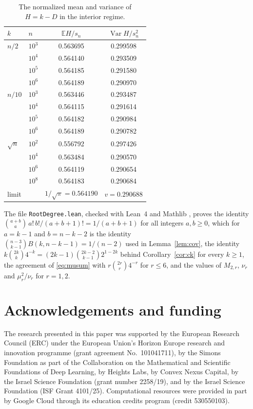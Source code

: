 \documentclass[11pt]{amsart}
\theoremstyle{remark}
\numberwithin{equation}{section}
\newcommand{\E}{\mathbb E}
\newcommand{\1}{\mathbf 1}
\newcommand{\Var}{\operatorname{Var}}
\begin{document}
\begin{table}[ht]
\centering
\begin{tabular}{llcc}
\toprule
$k$ & $n$ & $\E H/s_n$ & $\Var H/s_n^2$\\
\midrule
$n/2$ & $10^3$ & 0.563695 & 0.299598\\
 & $10^4$ & 0.564140 & 0.293509\\
 & $10^5$ & 0.564185 & 0.291580\\
 & $10^6$ & 0.564189 & 0.290970\\
\midrule
$n/10$ & $10^3$ & 0.563446 & 0.293487\\
 & $10^4$ & 0.564115 & 0.291614\\
 & $10^5$ & 0.564182 & 0.290984\\
 & $10^6$ & 0.564189 & 0.290782\\
\midrule
$\sqrt n$ & $10^2$ & 0.556792 & 0.297426\\
 & $10^4$ & 0.563484 & 0.290570\\
 & $10^6$ & 0.564119 & 0.290654\\
 & $10^8$ & 0.564183 & 0.290684\\
\midrule
limit & & $1/\sqrt\pi=0.564190$ & $v=0.290688$\\
\bottomrule
\end{tabular}
\caption{The normalized mean and variance of $H=k-D$ in the interior regime.}\label{tab:interior}
\end{table}

The file \texttt{RootDegree.lean}, checked with Lean~4 \cite{MU21} and Mathlib \cite{Mathlib20}, proves the identity $\binom{a+b}a\,a!\,b!/(a+b+1)!=1/(a+b+1)$ for all integers $a,b\ge0$, which for $a=k-1$ and $b=n-k-2$ is the identity $\binom{n-3}{k-1}B(k,n-k-1)=1/(n-2)$ used in Lemma~\ref{lem:cov}, the identity $k\binom{2k}k4^{-k}=(2k-1)\binom{2k-2}{k-1}2^{1-2k}$ behind Corollary~\ref{cor:ck} for every $k\ge1$, the agreement of \eqref{eq:musum} with $r\binom{2r}r4^{-r}$ for $r\le6$, and the values of $M_{2,r}$, $\nu_r$ and $\mu_r^2/\nu_r$ for $r=1,2$.

\section*{Acknowledgements and funding}
The research presented in this paper was supported by the European Research
Council (ERC) under the European Union's Horizon Europe research and
innovation programme (grant agreement No.~101041711), by the Simons
Foundation as part of the Collaboration on the Mathematical and Scientific
Foundations of Deep Learning, by Heights Labs, by Convex Nexus Capital, by
the Israel Science Foundation (grant number 2258/19), and by the Israel
Science Foundation (ISF Grant 4101/25). Computational resources were
provided in part by Google Cloud through its education credits program
(credit 530550103).
\end{document}
